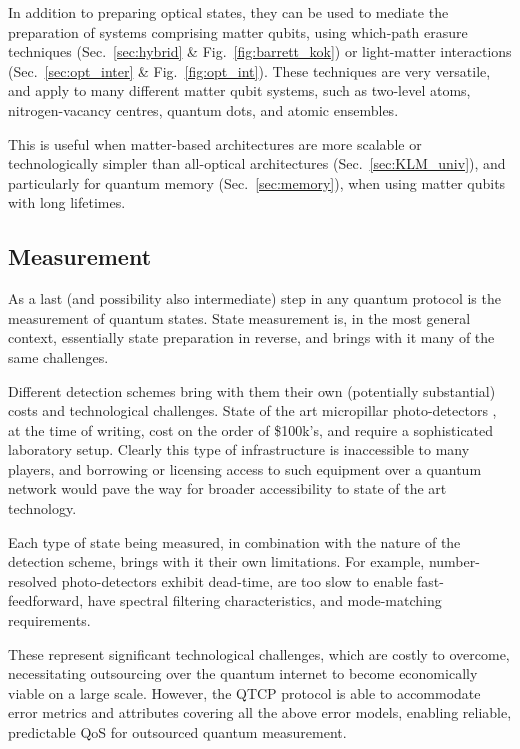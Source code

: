 \documentclass[aps,rmp,twocolumn,amsmath,amssymb,nofootinbib,superscriptaddress,longbibliography,floatfix,table-of-contents,eqsecnum]{revtex4-1}
\newcommand{\comment}[1]{{\color{blue}{\textbf{#1}}}}
\begin{document}
In addition to preparing optical states, they can be used to mediate the preparation of systems comprising matter qubits, using which-path erasure techniques (Sec.~\ref{sec:hybrid} \& Fig.~\ref{fig:barrett_kok}) or light-matter interactions (Sec.~\ref{sec:opt_inter} \& Fig.~\ref{fig:opt_int}). These techniques are very versatile, and apply to many different matter qubit systems, such as two-level atoms, nitrogen-vacancy centres, quantum dots, and atomic ensembles.

This is useful when matter-based architectures are more scalable or technologically simpler than all-optical architectures (Sec.~\ref{sec:KLM_univ}), and particularly for quantum memory (Sec.~\ref{sec:memory}), when using matter qubits with long lifetimes.

%
%

\subsection{Measurement} 

As a last (and possibility also intermediate) step in any quantum protocol is the measurement of quantum states. State measurement is, in the most general context, essentially state preparation in reverse, and brings with it many of the same challenges.

Different detection schemes bring with them their own (potentially substantial) costs and technological challenges. State of the art micropillar photo-detectors \cite{???}, at the time of writing, cost on the order of \$100k's, and require a sophisticated laboratory setup. Clearly this type of infrastructure is inaccessible to many players, and borrowing or licensing access to such equipment over a quantum network would pave the way for broader accessibility to state of the art technology.

Each type of state being measured, in combination with the nature of the detection scheme, brings with it their own limitations. For example, number-resolved photo-detectors exhibit dead-time, are too slow to enable fast-feedforward, have spectral filtering characteristics, and mode-matching requirements. \comment{Is this right?}

These represent significant technological challenges, which are costly to overcome, necessitating outsourcing over the quantum internet to become economically viable on a large scale. However, the QTCP protocol is able to accommodate error metrics and attributes covering all the above error models, enabling reliable, predictable QoS for outsourced quantum measurement.
\end{document}

